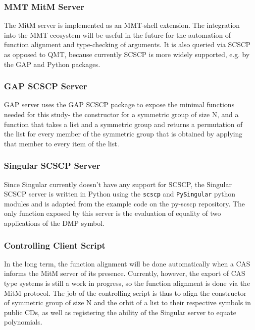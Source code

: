 \subsubsection{MMT MitM Server}
The MitM server is implemented as an MMT-shell extension. The integration into the
MMT ecosystem will be useful in the future for the automation of function 
alignment and type-checking of arguments. It is also queried via SCSCP as opposed 
to QMT, because currently SCSCP is more widely supported, e.g. by the GAP and 
Python packages.

\subsubsection{GAP SCSCP Server}
GAP server uses the GAP SCSCP package to expose the minimal functions needed for 
this study- the constructor for a symmetric group of size N, and a function that
takes a list and a symmetric group and returns a permutation of the list for every 
member of the symmetric group that is obtained by applying that member to every
item of the list.

\subsubsection{Singular SCSCP Server}
Since Singular currently doesn't have any support for SCSCP, the Singular SCSCP server is
written in Python using the \lstinline|scscp| and \lstinline|PySingular| python modules
and is adapted from the example code on the py-scscp repository\cite{PySCSCP}. The only
function exposed by this server is the evaluation of equality of two applications of the
DMP symbol.

\subsubsection{Controlling Client Script}
In the long term, the function alignment will be done automatically when a CAS 
informs the MitM server of its presence. Currently, however, the export of CAS 
type systems is still a work in progress, so the function alignment is done
via the MitM protocol. The job of the controlling script is thus to align the 
constructor of symmetric group of size N and the orbit of a list to their 
respective symbols in public CDs, as well as registering the ability of the 
Singular server to equate polynomials.

